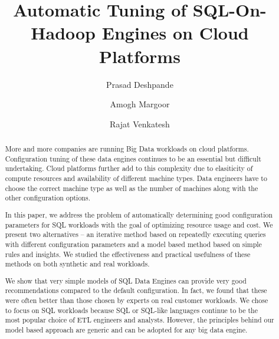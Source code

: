 \documentclass[sigconf]{acmart}
\begin{document}
\title{Automatic Tuning of SQL-On-Hadoop Engines on Cloud Platforms}

\author{Prasad Deshpande}

\author{Amogh Margoor}

\author{Rajat Venkatesh}

\renewcommand{\shortauthors}{P. Deshpande et al.}


\begin{abstract}
More and more companies are running Big Data workloads on cloud platforms. Configuration tuning of these data engines continues to be an essential but difficult undertaking. Cloud platforms further add to this complexity due to elasiticity of compute resources and availability of different machine types. Data engineers have to choose the correct machine type as well as the number of machines along with the other configuration options.

In this paper, we address the problem of automatically determining good configuration parameters for SQL workloads with the goal of optimizing resource usage and cost. We present two alternatives -- an iterative method based on repeatedly executing queries with different configuration parameters and a model based method based on simple rules and insights. We studied the effectiveness and practical usefulness of these methods on both synthetic and real workloads.

We show that very simple models of SQL Data Engines can provide very good recommendations compared to the default configuration. In fact, we found that these were often better than those chosen by experts on real customer workloads. We chose to focus on SQL workloads because SQL or SQL-like languages continue to be the most popular choice of ETL engineers and analysts.  However, the principles behind our model based approach are generic and can be adopted for any big data engine. 
\end{abstract}



\maketitle








 
\end{document}
